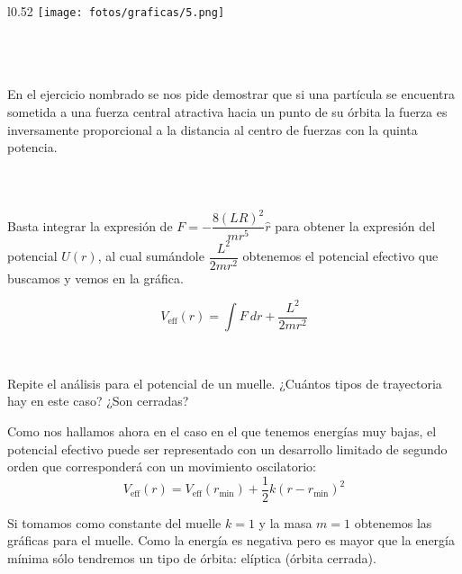 \documentclass[11pt]{article}
\newcommand{\laputa}[1]{\begin{note}{#1}{}\end{note}}
\begin{document}
            \begin{wrapfigure}[12]{l}{0.52\textwidth}
                \vspace{-0.3cm}
                \centering
                \texttt{[image: fotos/graficas/5.png]}
            \end{wrapfigure}
            
            \hspace{0cm}\\\hspace{0cm}\\\hspace{0cm}\\\noindent En el ejercicio nombrado se nos pide demostrar que si una partícula se encuentra sometida a una fuerza central atractiva hacia un punto de su órbita la fuerza es inversamente proporcional a la distancia al centro de fuerzas con la quinta potencia.\\\hspace{0cm}\\\hspace{0cm}\\\hspace{0cm}\\
    
            \noindent Basta integrar la expresión de $F=-\dfrac{8(LR)^2}{mr^5}\hat{r}$ para obtener la expresión del potencial $U(r)$, al cual sumándole $\dfrac{L^2}{2mr^2}$ obtenemos el potencial efectivo que buscamos y vemos en la gráfica.

            \[V_\text{eff}(r)=\int F\ dr+\dfrac{L^2}{2mr^2}\]

        \hspace{0cm}\\
        \laputa{Repite el análisis para el potencial de un muelle. ¿Cuántos tipos de trayectoria hay en este caso? ¿Son cerradas?}

            \noindent Como nos hallamos ahora en el caso en el que tenemos energías muy bajas, el potencial efectivo puede ser representado con un desarrollo limitado de segundo orden que corresponderá con un movimiento oscilatorio:
            \[V_\text{eff}(r)=V_\text{eff}(r_\text{min})+\dfrac{1}{2}k(r-r_\text{min})^2\]
    
            \noindent Si tomamos como constante del muelle $k=1$ y la masa $m=1$ obtenemos las gráficas para el muelle. Como la energía es negativa pero es mayor que la energía mínima sólo tendremos un tipo de órbita: elíptica (órbita cerrada).
\end{document}
